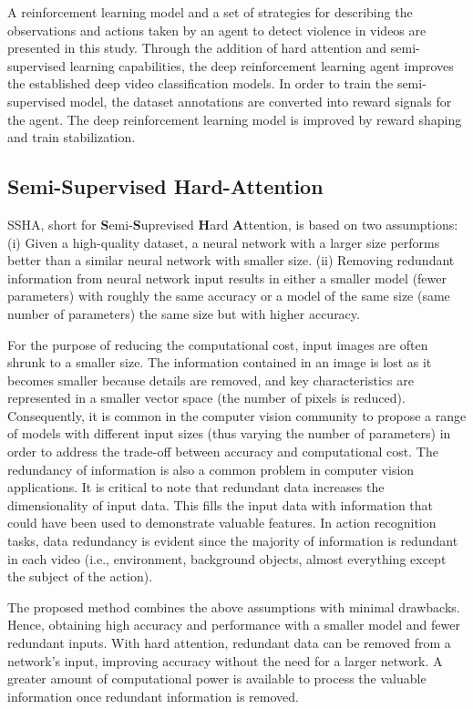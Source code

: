 \documentclass[review]{elsarticle}
\begin{document}
{A reinforcement learning model and a set of strategies for describing the observations and actions taken by an agent to detect violence in videos are presented in this study. Through the addition of hard attention and semi-supervised learning capabilities, the deep reinforcement learning agent improves the established deep video classification models. In order to train the semi-supervised model, the dataset annotations are converted into reward signals for the agent. The deep reinforcement learning model is improved by reward shaping and train stabilization.}

\subsection{Semi-Supervised Hard-Attention}
\label{3:1}

SSHA, short for \textbf{S}emi-\textbf{S}uprevised \textbf{H}ard \textbf{A}ttention, is based on two assumptions: (i) Given a high-quality dataset, a neural network with a larger size performs better than a similar neural network with smaller size. (ii) Removing redundant information from neural network input results in either a smaller model (fewer parameters) with roughly the same accuracy or a model of the same size (same number of parameters) the same size but with higher accuracy.

For the purpose of reducing the computational cost, input images are often shrunk to a smaller size. The information contained in an image is lost as it becomes smaller because details are removed, and key characteristics are represented in a smaller vector space (the number of pixels is reduced). Consequently, it is common in the computer vision community to propose a range of models with different input sizes (thus varying the number of parameters) in order to address the trade-off between accuracy and computational cost. The redundancy of information is also a common problem in computer vision applications. It is critical to note that redundant data increases the dimensionality of input data. This fills the input data with information that could have been used to demonstrate valuable features. In action recognition tasks, data redundancy is evident since the majority of information is redundant in each video (i.e., environment, background objects, almost everything except the subject of the action).

The proposed method combines the above assumptions with minimal drawbacks. Hence, obtaining high accuracy and performance with a smaller model and fewer redundant inputs. With hard attention, redundant data can be removed from a network's input, improving accuracy without the need for a larger network. A greater amount of computational power is available to process the valuable information once redundant information is removed.
\end{document}
